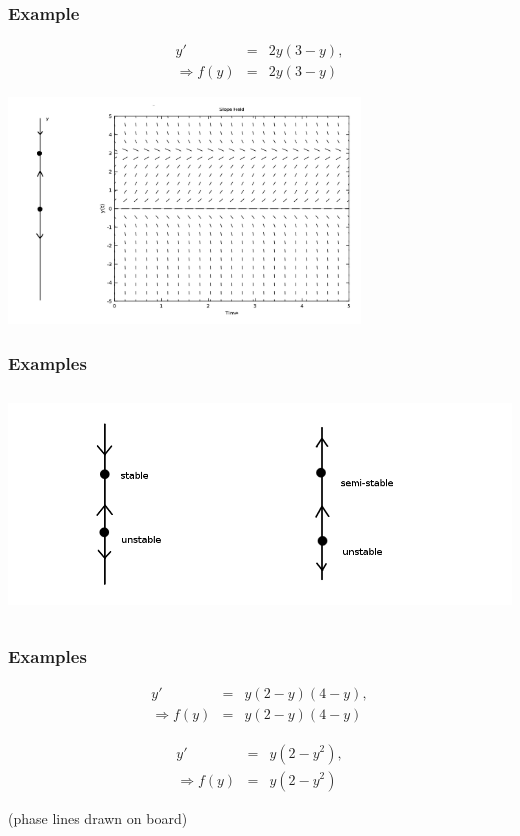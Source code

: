 \begin{frame}
  \frametitle{Example}
  \begin{eqnarray*}
    y' & = & 2y(3-y), \\
    \Rightarrow f(y) & = & 2y(3-y)
  \end{eqnarray*}


  \includegraphics[height=6cm]{img/week3PhaseLineExample1}

\end{frame}


\begin{frame}
  \frametitle{Examples}
  
  \includegraphics[height=6cm]{img/week3PhaseLine}

\end{frame}

\begin{frame}
  \frametitle{Examples}


  \begin{eqnarray*}
    y' & = & y(2-y)(4-y), \\
    \Rightarrow f(y) & = & y(2-y)(4-y)
  \end{eqnarray*}

  \begin{eqnarray*}
    y' & = & y(2-y^2), \\
    \Rightarrow f(y) & = & y(2-y^2)
  \end{eqnarray*}

  (phase lines drawn on board)

\end{frame}

